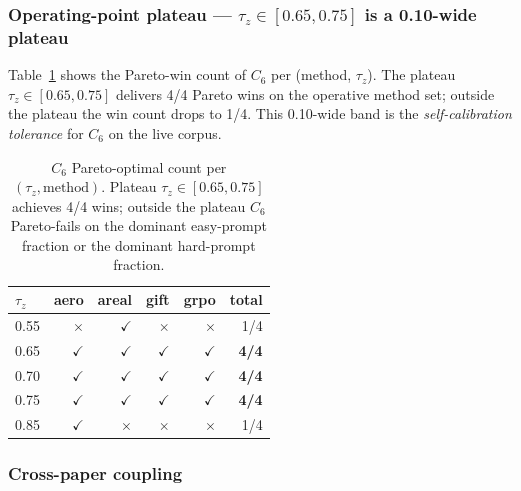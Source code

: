 \subsubsection*{Operating-point plateau --- $\tau_z \in [0.65, 0.75]$ is a 0.10-wide plateau}

Table~\ref{tab:p7-iter175-c6-sweep} shows the Pareto-win count of
$C_6$ per (method, $\tau_z$). The plateau
$\tau_z \in [0.65, 0.75]$ delivers 4/4 Pareto wins on the operative
method set; outside the plateau the win count drops to 1/4.
This 0.10-wide band is the \emph{self-calibration tolerance} for $C_6$
on the live corpus.

\begin{table}[ht]
\centering
\small
\begin{tabular}{lrrrrr}
\toprule
$\tau_z$ & aero & areal & gift & grpo & total \\
\midrule
0.55 & $\times$ & $\checkmark$ & $\times$ & $\times$ & 1/4 \\
0.65 & $\checkmark$ & $\checkmark$ & $\checkmark$ & $\checkmark$ & \textbf{4/4} \\
0.70 & $\checkmark$ & $\checkmark$ & $\checkmark$ & $\checkmark$ & \textbf{4/4} \\
0.75 & $\checkmark$ & $\checkmark$ & $\checkmark$ & $\checkmark$ & \textbf{4/4} \\
0.85 & $\checkmark$ & $\times$ & $\times$ & $\times$ & 1/4 \\
\bottomrule
\end{tabular}
\caption{$C_6$ Pareto-optimal count per $(\tau_z, \mathrm{method})$.
Plateau $\tau_z \in [0.65, 0.75]$ achieves 4/4 wins; outside the plateau
$C_6$ Pareto-fails on the dominant easy-prompt fraction or the dominant
hard-prompt fraction.}
\label{tab:p7-iter175-c6-sweep}
\end{table}

\subsubsection*{Cross-paper coupling}

